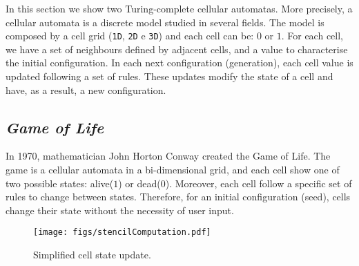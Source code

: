 \documentclass[12pt]{article}
\begin{document}
In this section we show two Turing-complete cellular automatas. More precisely, a cellular automata is a discrete model studied in several fields. The model is composed by a cell grid (\texttt{1D}, \texttt{2D} e \texttt{3D}) and each cell can be: $0$ or $1$. For each cell, we have a set of neighbours defined by adjacent cells, and a value to characterise the initial configuration. In each next configuration (generation), each cell value is updated following a set of rules. These updates modify the state of a cell and have, as a result, a new configuration.


\subsection{\textit{Game of Life}}

In 1970, mathematician John Horton Conway created the Game of Life. The game is a cellular automata in a bi-dimensional grid, and each cell show one of two possible states: alive($1$) or dead($0$). Moreover, each cell follow a specific set of rules to change between states. Therefore, for an initial configuration (seed), cells change their state without the necessity of user input.


\begin{figure}[h]
    \centering
    \texttt{[image: figs/stencilComputation.pdf]}
    \caption{Simplified cell state update.}
    \label{fig:stencil}
\end{figure}
\end{document}
